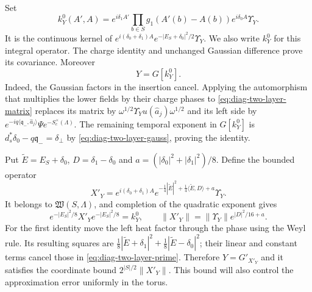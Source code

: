 \documentclass[11pt,letterpaper,reqno]{amsart}
\begin{document}
Set
\begin{equation}\label{eq:diag-two-layer-kernel}
 k_Y^0(A',A)=e^{i\delta_1A'}
             \prod_{b\in S}g_1(A'(b)-A(b))e^{i\delta_0A}
                         \Upsilon_Y.
\end{equation}
It is the continuous kernel of
$e^{i(\delta_0+\delta_1)A}e^{-|E_S+\delta_0|^2/2}\Upsilon_Y$.
We also write $k_Y^0$ for this integral operator.
The charge identity and unchanged Gaussian difference prove
its covariance. Moreover
\begin{equation}\label{eq:diag-two-layer-is-insertion}
 Y=G[k_Y^0].
\end{equation}
Indeed, the Gaussian factors in the insertion cancel. Applying
the automorphism that multiplies the lower fields by their
charge phases to \eqref{eq:diag-two-layer-matrix} replaces its
matrix by $\omega^{1/2}\Upsilon_Yu(\widehat a_j)\omega^{1/2}$
and its left side by
$e^{-iq\langle\mathfrak q_-,\widehat a_j\rangle}
 \Psi e^{-S_c^\times(\Lambda)}$. The remaining temporal exponent
in $G[k_Y^0]$ is
$d_s^*\delta_0-q\mathfrak q_-=\delta_\perp$ by
\eqref{eq:diag-two-layer-gauss}, proving the identity.

Put $\widetilde E=E_S+\delta_0$, $D=\delta_1-\delta_0$ and
$a=(|\delta_0|^2+|\delta_1|^2)/8$. Define the bounded operator
\begin{equation}\label{eq:diag-two-layer-prime}
 X'_Y=e^{i(\delta_0+\delta_1)A}
       e^{-\frac14|\widetilde E|^2+
                         \frac14\langle\widetilde E,D\rangle+a}
                                                      \Upsilon_Y.
\end{equation}
It belongs to $\mathfrak W(S,\Lambda)$, and completion of the
quadratic exponent gives
\[
 e^{-|E_S|^2/8}X'_Ye^{-|E_S|^2/8}=k_Y^0,
 \qquad
 \|X'_Y\|=\|\Upsilon_Y\|e^{|D|^2/16+a}.
\]
For the first identity move the left heat factor through the
phase using the Weyl rule. Its resulting squares are
$\frac18|\widetilde E+\delta_1|^2+
 \frac18|\widetilde E-\delta_0|^2$; their linear and constant
terms cancel those in \eqref{eq:diag-two-layer-prime}. Therefore
$Y=G'_{X'_Y}$ and it satisfies the coordinate bound
$2^{|S|/2}\|X'_Y\|$. This bound will also control the approximation
error uniformly in the torus.
\end{document}
